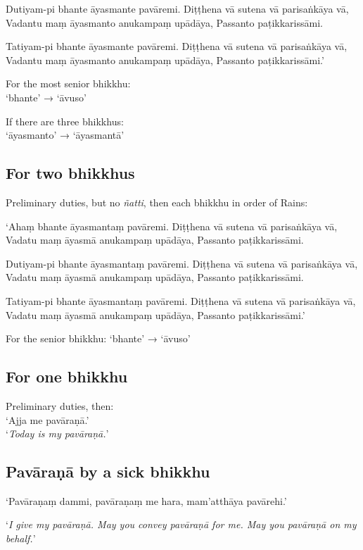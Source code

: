 Dutiyam-pi bhante āyasmante pavāremi. Diṭṭhena vā sutena vā parisaṅkāya vā,
Vadantu maṃ āyasmanto anukampaṃ upādāya, Passanto paṭikkarissāmi.

Tatiyam-pi bhante āyasmante pavāremi. Diṭṭhena vā sutena vā parisaṅkāya vā,
Vadantu maṃ āyasmanto anukampaṃ upādāya, Passanto paṭikkarissāmi.’

For the most senior bhikkhu:\\
‘bhante’ → ‘āvuso’

If there are three bhikkhus:\\
‘āyasmanto’ → ‘āyasmantā’

\subsection{For two bhikkhus}

Preliminary duties, but no \emph{ñatti}, then each bhikkhu in order of Rains:

‘Ahaṃ bhante āyasmantaṃ pavāremi. Diṭṭhena vā sutena vā parisaṅkāya vā, Vadatu
maṃ āyasmā anukampaṃ upādāya, Passanto paṭikkarissāmi.

Dutiyam-pi bhante āyasmantaṃ pavāremi. Diṭṭhena vā sutena vā parisaṅkāya vā,
Vadatu maṃ āyasmā anukampaṃ upādāya, Passanto paṭikkarissāmi.

Tatiyam-pi bhante āyasmantaṃ pavāremi. Diṭṭhena vā sutena vā parisaṅkāya vā,
Vadatu maṃ āyasmā anukampaṃ upādāya, Passanto paṭikkarissāmi.’

For the senior bhikkhu: ‘bhante’ → ‘āvuso’


\subsection{For one bhikkhu}

Preliminary duties, then:\\
‘Ajja me pavāraṇā.’\\
‘\emph{Today is my pavāraṇā.}’ 

\subsection{Pavāraṇā by a sick bhikkhu}

‘Pavāraṇaṃ dammi, pavāraṇaṃ me hara, mam'atthāya pavārehi.’

‘\emph{I give my pavāraṇā. May you convey pavāraṇā for me. May you pavāraṇā on
  my behalf.}’

